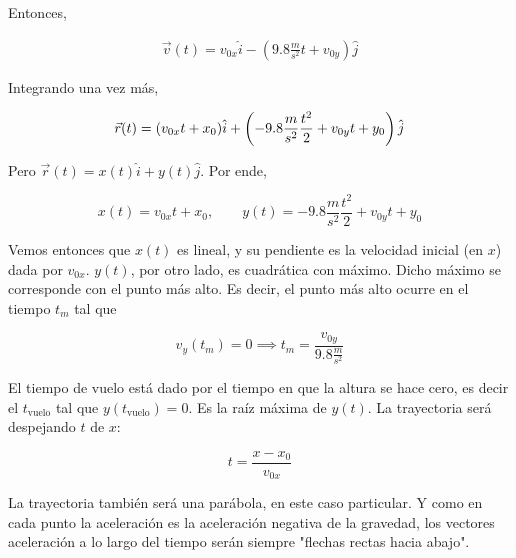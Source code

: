 \documentclass[12pt]{article}
\theoremstyle{definition}
\begin{document}
Entonces, 

\begin{align*}
    \vec{v}(t) = v_{0x} \hat{i} - ( 9.8 \frac{m}{s^2}t + v_{0y} ) \hat{j}
\end{align*}

Integrando una vez más, 

\begin{equation*}
    \vec{r}(t) 
    = ( v_{0x}t + x_0 ) \hat{i} + \left( - 9.8 \frac{m}{s^2}
    \frac{t^2}{2} + v_{0y}t + y_0 \right)  \hat{j}\\ 
\end{equation*}

Pero $\vec{r}(t) = x(t) \hat{i} + y(t) \hat{j}$. Por ende, 

\begin{equation*}
    x(t) = v_{0x} t + x_0, \qquad y(t) = - 9.8 \frac{m}{s^2} \frac{t^2}{2} +
    v_{0y}t + y_0
\end{equation*}

Vemos entonces que $x(t)$ es lineal, y su pendiente es la velocidad inicial (en
$x$) dada por $v_{0x}$. $y(t)$, por otro lado, es cuadrática con máximo. Dicho
máximo se corresponde con el punto más alto. Es decir, el punto más alto ocurre
en el tiempo $t_m$ tal que

\begin{equation*}
    v_y(t_m) = 0 \implies t_m = \frac{v_{0y}}{9.8 \frac{m}{s^2}}
\end{equation*}

El tiempo de vuelo está dado por el tiempo en que la altura se hace cero, es
decir el $t_{\text{vuelo}}$ tal que $y(t_{\text{vuelo}}) = 0$. Es la raíz máxima
de
$y(t)$. La trayectoria será despejando $t$ de $x$: 

\begin{equation*}
    t = \frac{x - x_0}{v_{0x}}
\end{equation*}

La trayectoria también será una parábola, en este caso particular. Y como en
cada punto la aceleración es la aceleración negativa de la gravedad, los
vectores aceleración a lo largo del tiempo serán siempre "flechas rectas hacia
abajo".
\end{document}
